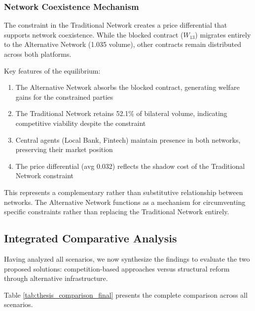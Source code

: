 \subsubsection{Network Coexistence Mechanism}

The constraint in the Traditional Network creates a price differential that supports network coexistence. While the blocked contract ($W_{13}$) migrates entirely to the Alternative Network (1.035 volume), other contracts remain distributed across both platforms.

Key features of the equilibrium:
\begin{enumerate}
    \item The Alternative Network absorbs the blocked contract, generating welfare gains for the constrained parties
    \item The Traditional Network retains 52.1\% of bilateral volume, indicating competitive viability despite the constraint
    \item Central agents (Local Bank, Fintech) maintain presence in both networks, preserving their market position
    \item The price differential (avg 0.032) reflects the shadow cost of the Traditional Network constraint
\end{enumerate}

This represents a complementary rather than substitutive relationship between networks. The Alternative Network functions as a mechanism for circumventing specific constraints rather than replacing the Traditional Network entirely.

\subsection{Integrated Comparative Analysis}
\label{sec:final_comparison}

Having analyzed all scenarios, we now synthesize the findings to evaluate the two proposed solutions: competition-based approaches versus structural reform through alternative infrastructure.

Table \ref{tab:thesis_comparison_final} presents the complete comparison across all scenarios.


